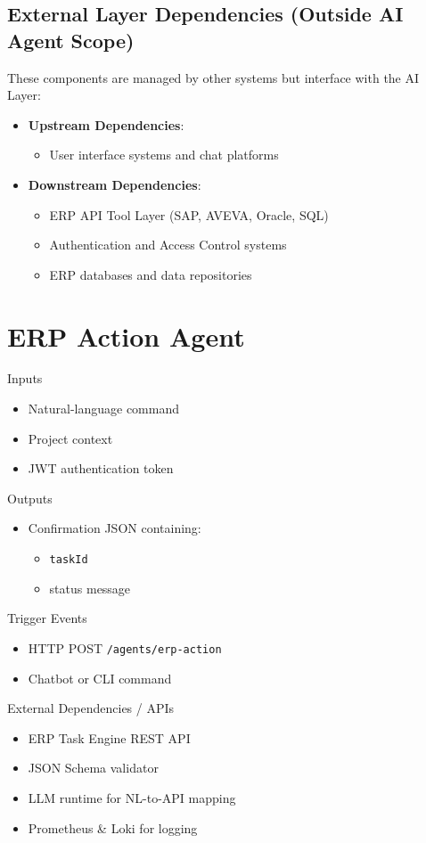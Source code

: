 \documentclass[12pt]{report}
\begin{document}
\subsection{External Layer Dependencies (Outside AI Agent Scope)}
These components are managed by other systems but interface with the AI Layer:
\begin{itemize}
  \item \textbf{Upstream Dependencies}:
    \begin{itemize}
      \item User interface systems and chat platforms
    \end{itemize}
  \item \textbf{Downstream Dependencies}:
    \begin{itemize}
      \item ERP API Tool Layer (SAP, AVEVA, Oracle, SQL)
      \item Authentication and Access Control systems
      \item ERP databases and data repositories
    \end{itemize}
\end{itemize}

\section{ERP Action Agent}
\begin{description}
  \item Inputs
    \begin{itemize}
      \item Natural-language command  
      \item Project context  
      \item JWT authentication token  
    \end{itemize}
  \item Outputs
    \begin{itemize}
      \item Confirmation JSON containing:
      \begin{itemize}
        \item \texttt{taskId}  
        \item status message  
      \end{itemize}
    \end{itemize}
  \item Trigger Events
    \begin{itemize}
      \item HTTP POST \texttt{/agents/erp-action}
      \item Chatbot or CLI command  
    \end{itemize}
  \item External Dependencies / APIs
    \begin{itemize}
      \item ERP Task Engine REST API  
      \item JSON Schema validator  
      \item LLM runtime for NL-to-API mapping  
      \item Prometheus \& Loki for logging  
    \end{itemize}
\end{description}
\end{document}
